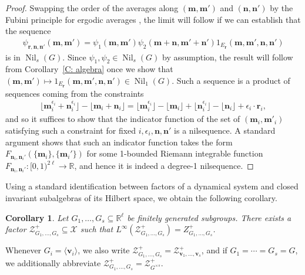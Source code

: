 \documentclass[11pt]{amsart}
\newtheorem{corollary}[lemma]{Corollary}
\theoremstyle{definition}
\newcommand{\C}{{\mathbb C}}
\newcommand{\R}{{\mathbb R}}
\newcommand{\CX}{{\mathcal X}}
\newcommand{\CZ}{{\mathcal Z}}
\newcommand{\bm}{{\mathbf{m}}}
\newcommand{\bn}{{\mathbf{n}}}
\newcommand{\br}{{\mathbf{r}}}
\newcommand{\bv}{{\mathbf{v}}}
\newcommand{\eps}{\epsilon}
\newcommand{\1}{{\mathbf{1}}}
\DeclareMathOperator{\Nil}{Nil}
\newcommand{\sfloor}[1]{{\lfloor #1 \rfloor}}
\newcommand{\srem}[1]{ \{ #1 \}}
\begin{document}
\begin{proof}
    Swapping the order of the averages along $(\bm, \bm')$ and $(\bn, \bn')$ {by the Fubini principle for ergodic averages \cite[Lemma 1.1]{BL15}}, the limit will follow if we can establish that the sequence
    \begin{align*}
        \psi_{\br, \bn,\bn'}(\bm,\bm') = \psi_1(\bm,\bm')\psi_2(\bm+\bn, \bm'+\bn')1_{E_\br}(\bm,\bm',\bn,\bn')
    \end{align*}
     is in $\Nil_s(G)$.  Since $\psi_1, \psi_2\in\Nil_s(G)$ by assumption, 
     the result will follow from Corollary~\ref{C: algebra} once we show that $(\bm,\bm')\mapsto 1_{E_\br}(\bm,\bm',\bn,\bn')\in\Nil_1(G)$. 
     Such a sequence is a product of sequences coming from the constraints
    \begin{align*}
        \sfloor{\bm_i^{\eps_i}+\bn_i^{\eps_i}}-\sfloor{\bm_i + \bn_i}
        = \sfloor{\bm_i^{\eps_i}}-\sfloor{\bm_i}+\sfloor{\bn_i^{\eps_i}} - \sfloor{\bn_i} + \eps_i\cdot \br_{i},
    \end{align*}
    and so it suffices to show that the indicator function of the set of $(\bm_i,\bm'_i)$ satisfying such a constraint for fixed $i,\eps_i,\bn,\bn'$ is a nilsequence. A standard argument shows that such an indicator function takes the form $F_{\bn_i,\bn_i'}(\srem{\bm_i}, \srem{\bm_i'})$ for some 1-bounded Riemann integrable function $F_{\bn_i,\bn_i'}:[0,1)^{2\ell}\to\R$, and hence it is indeed a degree-1 nilsequence. 
    \end{proof}

Using a standard identification between factors of a dynamical system and closed invariant subalgebras of its Hilbert space, we obtain the following corollary.
\begin{corollary}
Let $G_1, \ldots, G_s\subseteq\R^\ell$ be finitely generated subgroups. There exists a factor $\CZ_{G_1, \ldots, G_s}^+\subseteq \CX$ such that $L^\infty(\CZ_{G_1, \ldots, G_s}^+) = Z_{G_1, \ldots, G_s}^+$.
\end{corollary}
Whenever $G_i = \langle \bv_i\rangle$, we also write $\CZ^+_{G_1, \ldots, G_s} = \CZ^+_{\bv_1, \ldots, \bv_s}$, and if $G_1 = \cdots = G_s = G$, we additionally abbreviate $\CZ^+_{G_1, \ldots, G_s} = \CZ^+_{G^{\times s}}$.
\end{document}
